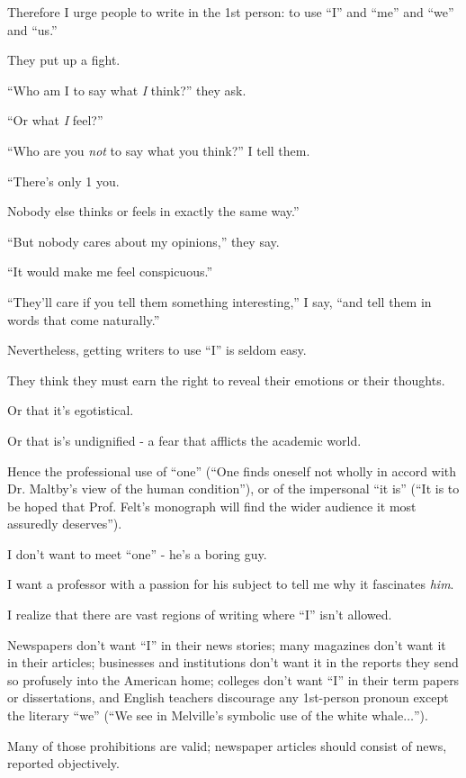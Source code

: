 \documentclass{book}
\numberwithin{equation}{section}
\begin{document}
Therefore I urge people to write in the 1st person: to use ``I'' and ``me'' and ``we'' and ``us.''

They put up a fight.

%
``Who am I to say what \textit{I} think?'' they ask.

``Or what \textit{I} feel?''

%
``Who are you \textit{not} to say what you think?'' I tell them.

``There's only 1 you.

Nobody else thinks or feels in exactly the same way.''

%
``But nobody cares about my opinions,'' they say.

``It would make me feel conspicuous.''

``They'll care if you tell them something interesting,'' I say, ``and tell them in words that come naturally.''

%
Nevertheless, getting writers to use ``I'' is seldom easy.

They think they must earn the right to reveal their emotions or their thoughts.

Or that it's egotistical.

Or that is's undignified - a fear that afflicts the academic world.

Hence the professional use of ``one'' (``One finds oneself not wholly in accord with Dr. Maltby's view of the human condition''), or of the impersonal ``it is'' (``It is to be hoped that Prof. Felt's monograph will find the wider audience it most assuredly deserves'').

I don't want to meet ``one'' - he's a boring guy.

I want a professor with a passion for his subject to tell me why it fascinates \textit{him}.

%
I realize that there are vast regions of writing where ``I'' isn't allowed.

Newspapers don't want ``I'' in their news stories; many magazines don't want it in their articles; businesses and institutions don't want it in the reports they send so profusely into the American home; colleges don't want ``I'' in their term papers or dissertations, and English teachers discourage any 1st-person pronoun except the literary ``we'' (``We see in Melville's symbolic use of the white whale$\ldots$'').

Many of those prohibitions are valid; newspaper articles should consist of news, reported objectively.
\end{document}
